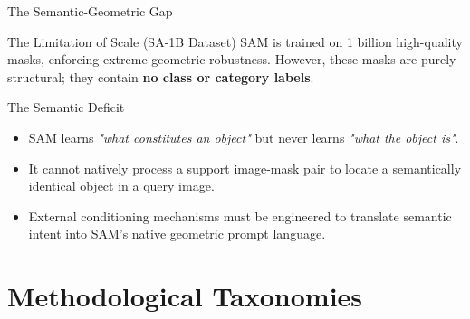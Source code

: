 \documentclass[aspectratio=169, 10pt]{beamer}
\begin{document}
\begin{frame}{The Semantic-Geometric Gap}
    \begin{block}{The Limitation of Scale (SA-1B Dataset)}
        SAM is trained on 1 billion high-quality masks, enforcing extreme geometric robustness. However, these masks are purely structural; they contain \textbf{no class or category labels}.
    \end{block}

    \begin{alertblock}{The Semantic Deficit}
        \begin{itemize}
            \item SAM learns \textit{"what constitutes an object"} but never learns \textit{"what the object is"}.
            \item It cannot natively process a support image-mask pair to locate a semantically identical object in a query image.
            \item External conditioning mechanisms must be engineered to translate semantic intent into SAM's native geometric prompt language.
        \end{itemize}
    \end{alertblock}
\end{frame}

\section{Methodological Taxonomies}
\end{document}
